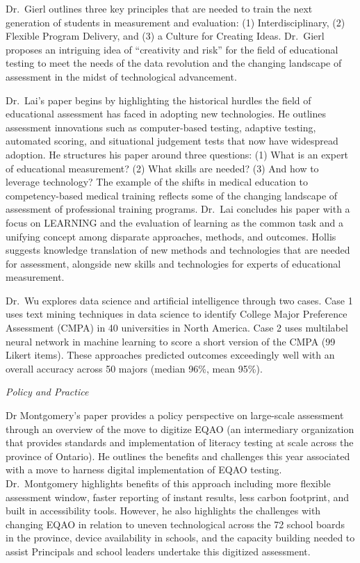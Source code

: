 \documentclass[
]{book}
\begin{document}
Dr.~Gierl outlines three key principles that are needed to train the next generation of students in measurement and evaluation: (1) Interdisciplinary, (2) Flexible Program Delivery, and (3) a Culture for Creating Ideas. Dr.~Gierl proposes an intriguing idea of ``creativity and risk'' for the field of educational testing to meet the needs of the data revolution and the changing landscape of assessment in the midst of technological advancement.

Dr.~Lai's paper begins by highlighting the historical hurdles the field of educational assessment has faced in adopting new technologies. He outlines assessment innovations such as computer-based testing, adaptive testing, automated scoring, and situational judgement tests that now have widespread adoption. He structures his paper around three questions: (1) What is an expert of educational measurement? (2) What skills are needed? (3) And how to leverage technology? The example of the shifts in medical education to competency-based medical training reflects some of the changing landscape of assessment of professional training programs. Dr.~Lai concludes his paper with a focus on LEARNING and the evaluation of learning as the common task and a unifying concept among disparate approaches, methods, and outcomes. Hollis suggests knowledge translation of new methods and technologies that are needed for assessment, alongside new skills and technologies for experts of educational measurement.

Dr.~Wu explores data science and artificial intelligence through two cases. Case 1 uses text mining techniques in data science to identify College Major Preference Assessment (CMPA) in 40 universities in North America. Case 2 uses multilabel neural network in machine learning to score a short version of the CMPA (99 Likert items). These approaches predicted outcomes exceedingly well with an overall accuracy across 50 majors (median 96\%, mean 95\%).

\emph{Policy and Practice}

Dr Montgomery's paper provides a policy perspective on large-scale assessment through an overview of the move to digitize EQAO (an intermediary organization that provides standards and implementation of literacy testing at scale across the province of Ontario). He outlines the benefits and challenges this year associated with a move to harness digital implementation of EQAO testing. Dr.~Montgomery highlights benefits of this approach including more flexible assessment window, faster reporting of instant results, less carbon footprint, and built in accessibility tools. However, he also highlights the challenges with changing EQAO in relation to uneven technological across the 72 school boards in the province, device availability in schools, and the capacity building needed to assist Principals and school leaders undertake this digitized assessment.
\end{document}
